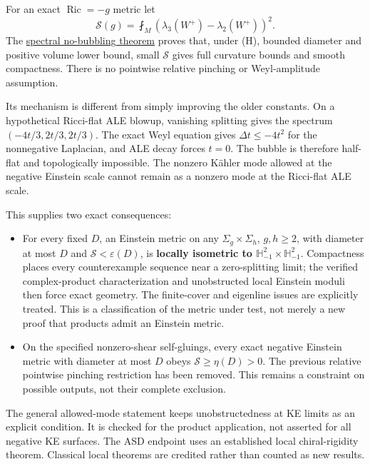 \documentclass[
  11pt,
]{article}
\providecommand{\tightlist}{%
  \setlength{\itemsep}{0pt}\setlength{\parskip}{0pt}}
\begin{document}
For an exact \(\operatorname{Ric}=-g\) metric let \[
 \mathscr S(g)=\fint_M
       (\lambda_3(W^+)-\lambda_2(W^+))^2.
                                                               \tag{6}
\] The \href{20260923_allowed_mode_rigidity.md}{spectral no-bubbling
theorem} proves that, under (H), bounded diameter and positive volume
lower bound, small \(\mathscr S\) gives full curvature bounds and smooth
compactness. There is no pointwise relative pinching or Weyl-amplitude
assumption.

Its mechanism is different from simply improving the older constants. On
a hypothetical Ricci-flat ALE blowup, vanishing splitting gives the
spectrum \((-4t/3,2t/3,2t/3)\). The exact Weyl equation gives
\(\Delta t\le-4t^2\) for the nonnegative Laplacian, and ALE decay forces
\(t=0\). The bubble is therefore half-flat and topologically impossible.
The nonzero Kähler mode allowed at the negative Einstein scale cannot
remain as a nonzero mode at the Ricci-flat ALE scale.

This supplies two exact consequences:

\begin{itemize}
\tightlist
\item
  For every fixed \(D\), an Einstein metric on any
  \(\Sigma_g\times\Sigma_h\), \(g,h\ge2\), with diameter at most \(D\)
  and \(\mathscr S<\varepsilon(D)\), is \textbf{locally isometric to
  \(\mathbb H^2_{-1}\times\mathbb H^2_{-1}\)}. Compactness places every
  counterexample sequence near a zero-splitting limit; the verified
  complex-product characterization and unobstructed local Einstein
  moduli then force exact geometry. The finite-cover and eigenline
  issues are explicitly treated. This is a classification of the metric
  under test, not merely a new proof that products admit an Einstein
  metric.
\item
  On the specified nonzero-shear self-gluings, every exact negative
  Einstein metric with diameter at most \(D\) obeys
  \(\mathscr S\ge\eta(D)>0\). The previous relative pointwise pinching
  restriction has been removed. This remains a constraint on possible
  outputs, not their complete exclusion.
\end{itemize}

The general allowed-mode statement keeps unobstructedness at KE limits
as an explicit condition. It is checked for the product application, not
asserted for all negative KE surfaces. The ASD endpoint uses an
established local chiral-rigidity theorem. Classical local theorems are
credited rather than counted as new results.
\end{document}
